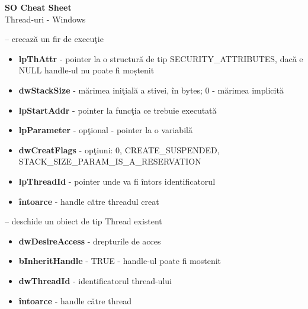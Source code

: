 \documentclass{refcard.cs.pub.ro}
\begin{document}
\raggedright
\footnotesize
\begin{multicols*}{3}

\setlength{\columnseprule}{0.25pt}
\setlength{\premulticols}{1pt}
\setlength{\postmulticols}{1pt}
\setlength{\multicolsep}{1pt}
\setlength{\columnsep}{2pt}

\begin{center}
     \Large{\textbf{SO Cheat Sheet}} \\
      {Thread-uri - Windows}\\
\end{center}

 -- creează un fir de execuţie
\begin{itemize}
  \item \textbf{lpThAttr} - pointer la o structură de tip SECURITY_ATTRIBUTES, dacă e NULL handle-ul nu poate fi
moștenit
  \item \textbf{dwStackSize} - mărimea iniţială a stivei, în bytes; 0 - mărimea implicită 
  \item \textbf{lpStartAddr} - pointer la funcţia ce trebuie executată
  \item \textbf{lpParameter} - opţional - pointer la o variabilă
  \item \textbf{dwCreatFlags} - opţiuni: 0, CREATE_SUSPENDED, STACK_SIZE_PARAM_IS_A_RESERVATION
  \item \textbf{lpThreadId} - pointer unde va fi întors identificatorul
  \item \textbf{întoarce} - handle către threadul creat
\end{itemize}

 -- deschide un obiect de tip Thread existent
\begin{itemize}
  \item \textbf{dwDesireAccess} - drepturile de acces
  \item \textbf{bInheritHandle} - TRUE - handle-ul poate fi mostenit
  \item \textbf{dwThreadId} - identificatorul thread-ului
  \item \textbf{întoarce} - handle către thread
\end{itemize}


\end{multicols*}
\end{document}
